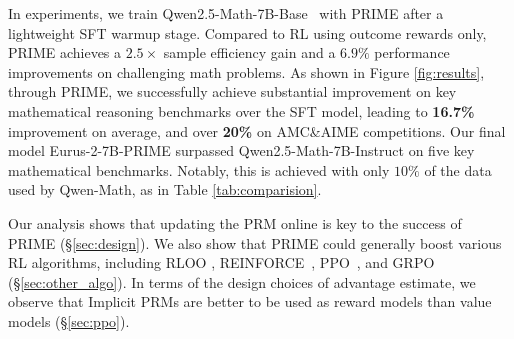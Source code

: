 In experiments, we train Qwen2.5-Math-7B-Base~\citep{yang2024qwen25mathtechnicalreportmathematical} with PRIME after a lightweight SFT warmup stage. Compared to RL using outcome rewards only, PRIME achieves a $2.5\times$ sample efficiency gain and a $6.9\%$ performance improvements on challenging math problems.
As shown in Figure \ref{fig:results}, through PRIME, we successfully achieve substantial improvement on key mathematical reasoning benchmarks over the SFT model, leading to \textbf{16.7\%} improvement on average, and over \textbf{20\%} on AMC\&AIME competitions. Our final model Eurus-2-7B-PRIME surpassed Qwen2.5-Math-7B-Instruct on five key mathematical benchmarks. 
Notably, this is achieved with only $10\%$ of the data used by Qwen-Math, as in Table \ref{tab:comparision}.


Our analysis shows that updating the PRM online is key to the success of PRIME (\S \ref{sec:design}).
We also show that PRIME could generally boost various RL algorithms, including RLOO \citep{ahmadian2024back}, REINFORCE~\citep{williams1992simple}, PPO~\citep{schulman2017proximal}, and GRPO~\citep{deepseek-math} (\S \ref{sec:other_algo}). 
In terms of the design choices of advantage estimate, 
we observe that Implicit PRMs are better to be used as reward models than value models (\S \ref{sec:ppo}).


